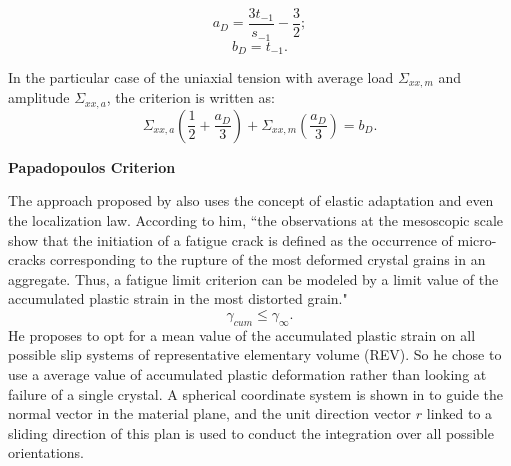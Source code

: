$$a_D=\frac{3t_{-1}}{s_{-1}}-\frac{3}{2};$$  $$b_D=t_{-1}.$$

In the particular case of the uniaxial tension with average load $\Sigma_{xx,m}$ and amplitude $\Sigma_{xx,a}$, the criterion is written as:
$$\Sigma_{xx,a}\left(\dfrac{1}{2}+\dfrac{a_D}{3} \right)+\Sigma_{xx,m}\left(\dfrac{a_D}{3} \right) =b_D.$$

\textbf{Papadopoulos Criterion}

The approach proposed by \cite{papadopoulos1993fatigue} also uses the concept of elastic adaptation and even the localization law. According to him, ``the observations at the mesoscopic scale show that the initiation of a fatigue crack is
defined as the occurrence of micro-cracks corresponding to the rupture of the most deformed crystal grains in an
aggregate. Thus, a fatigue limit criterion can be modeled by a limit value of the accumulated plastic strain in the
most distorted grain."
$$\gamma_{cum}\leqslant\gamma_\infty.$$
He proposes to opt for a mean value of the accumulated plastic strain on all possible slip systems of representative elementary volume (REV). So he chose to use a average value  of accumulated plastic deformation rather than looking at failure of a single crystal. A spherical coordinate system is shown in  to guide the normal vector in the material plane, and the unit direction vector $r$ linked to a sliding direction of this plan is used to conduct the integration over all possible orientations.

